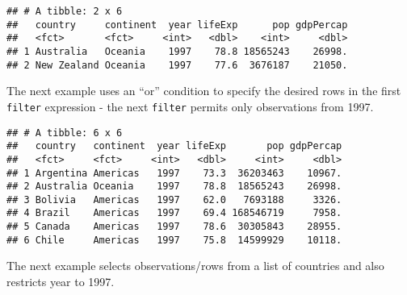\documentclass[
]{book}
\newenvironment{Shaded}{\begin{snugshade}}{\end{snugshade}}
\newcommand{\DecValTok}[1]{\textcolor[rgb]{0.00,0.00,0.81}{#1}}
\newcommand{\KeywordTok}[1]{\textcolor[rgb]{0.13,0.29,0.53}{\textbf{#1}}}
\newcommand{\NormalTok}[1]{#1}
\newcommand{\OperatorTok}[1]{\textcolor[rgb]{0.81,0.36,0.00}{\textbf{#1}}}
\newcommand{\StringTok}[1]{\textcolor[rgb]{0.31,0.60,0.02}{#1}}
\begin{document}
\begin{verbatim}
## # A tibble: 2 x 6
##   country     continent  year lifeExp      pop gdpPercap
##   <fct>       <fct>     <int>   <dbl>    <int>     <dbl>
## 1 Australia   Oceania    1997    78.8 18565243    26998.
## 2 New Zealand Oceania    1997    77.6  3676187    21050.
\end{verbatim}

The next example uses an ``or'' condition to specify the desired rows in the first \texttt{filter} expression - the next \texttt{filter} permits only observations from 1997.

\begin{Shaded}
\end{Shaded}

\begin{verbatim}
## # A tibble: 6 x 6
##   country   continent  year lifeExp       pop gdpPercap
##   <fct>     <fct>     <int>   <dbl>     <int>     <dbl>
## 1 Argentina Americas   1997    73.3  36203463    10967.
## 2 Australia Oceania    1997    78.8  18565243    26998.
## 3 Bolivia   Americas   1997    62.0   7693188     3326.
## 4 Brazil    Americas   1997    69.4 168546719     7958.
## 5 Canada    Americas   1997    78.6  30305843    28955.
## 6 Chile     Americas   1997    75.8  14599929    10118.
\end{verbatim}

The next example selects observations/rows from a list of countries and also restricts year to 1997.

\begin{Shaded}
\end{Shaded}
\end{document}
